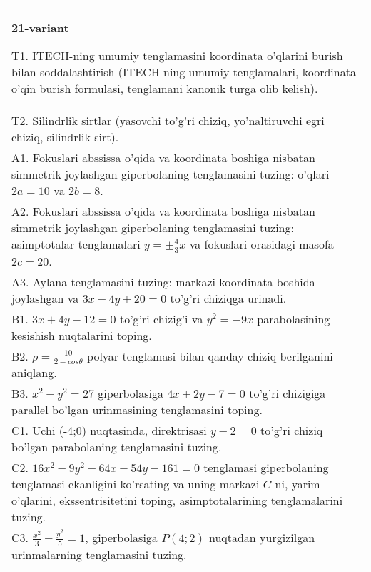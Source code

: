\documentclass{article}
\begin{document}
\begin{tabular}{m{17cm}}
\textbf{21-variant}
\newline

T1. ITECH-ning umumiy tenglamasini koordinata o'qlarini burish bilan soddalashtirish (ITECH-ning umumiy tenglamalari, koordinata o'qin burish formulasi, tenglamani kanonik turga olib kelish).\\

T2. Silindrlik sirtlar (yasovchi to'g'ri chiziq, yo'naltiruvchi egri chiziq, silindrlik sirt).\\

A1. Fokuslari abssissa o'qida va koordinata boshiga nisbatan simmetrik joylashgan giperbolaning tenglamasini tuzing: o'qlari $2a=10$ va $2b=8$.\\

A2. Fokuslari abssissa o'qida va koordinata boshiga nisbatan simmetrik joylashgan giperbolaning tenglamasini tuzing: asimptotalar tenglamalari $y=\pm \frac{4}{3}x$ va fokuslari orasidagi masofa $2c=20$.\\

A3. Aylana tenglamasini tuzing: markazi koordinata boshida joylashgan va $3x-4y+20=0$ to'g'ri chiziqga urinadi.\\

B1. $3x + 4y - 12 = 0$ to'g'ri chizig'i va $y^{2} = - 9x$ parabolasining kesishish nuqtalarini toping.\\

B2. $\rho = \frac{10}{2 - cos\theta}$ polyar tenglamasi bilan qanday chiziq berilganini aniqlang.  \\

B3. $x^{2} - y^{2} = 27$ giperbolasiga $4x + 2y - 7 = 0$ to'g'ri chizigiga parallel bo'lgan urinmasining tenglamasini toping.  \\

C1. Uchi (-4;0) nuqtasinda, direktrisasi $y - 2 = 0$ to'g'ri chiziq bo'lgan parabolaning tenglamasini tuzing.\\

C2. $16x^{2} - 9y^{2} - 64x - 54y - 161 = 0$ tenglamasi giperbolaning tenglamasi ekanligini ko'rsating va uning markazi $C$ ni, yarim o'qlarini, ekssentrisitetini toping, asimptotalarining tenglamalarini tuzing.  \\

C3. $\frac{x^{2}}{3} - \frac{y^{2}}{5} = 1$, giperbolasiga $P(4;2)$ nuqtadan yurgizilgan urinmalarning tenglamasini tuzing.  \\

\end{tabular}
\vspace{1cm}
\end{document}
